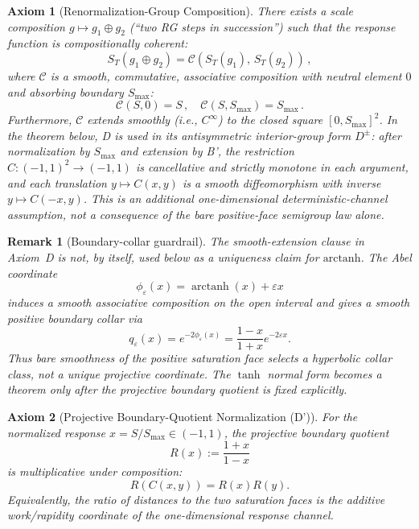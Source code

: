 \documentclass[aps,prd,twocolumn,superscriptaddress,nofootinbib]{revtex4-2}
\newtheorem{remark}{Remark}
\newtheorem{axiom}{Axiom}
\begin{document}
\begin{axiom}[Renormalization-Group Composition]
\label{ax:composition}
There exists a scale composition $g \mapsto g_1 \oplus g_2$ (``two RG steps in succession'') such that the response function is compositionally coherent:
\begin{equation}
S_T(g_1 \oplus g_2) = \mathcal{C}\!\left(S_T(g_1),\, S_T(g_2)\right)\,,
\label{eq:composition}
\end{equation}
where $\mathcal{C}$ is a smooth, commutative, associative composition with neutral element $0$ and absorbing boundary $S_{\max}$:
\begin{equation}
\mathcal{C}(S, 0) = S\,, \quad \mathcal{C}(S, S_{\max}) = S_{\max}\,.
\label{eq:composition_boundary}
\end{equation}
Furthermore, $\mathcal{C}$ extends smoothly (i.e., $C^\infty$) to the closed square $[0, S_{\max}]^2$. In the theorem below, D is used in its antisymmetric interior-group form $D^\pm$: after normalization by $S_{\max}$ and extension by B', the restriction $C:(-1,1)^2\to(-1,1)$ is cancellative and strictly monotone in each argument, and each translation $y\mapsto C(x,y)$ is a smooth diffeomorphism with inverse $y\mapsto C(-x,y)$. This is an additional one-dimensional deterministic-channel assumption, not a consequence of the bare positive-face semigroup law alone.
\end{axiom}

\begin{remark}[Boundary-collar guardrail]
The smooth-extension clause in Axiom~D is not, by itself, used below as a uniqueness claim for $\mathrm{arctanh}$. The Abel coordinate
\[
  \phi_\varepsilon(x)=\operatorname{arctanh}(x)+\varepsilon x
\]
induces a smooth associative composition on the open interval and gives a smooth positive boundary collar via
\[
  q_\varepsilon(x)=e^{-2\phi_\varepsilon(x)}
  =\frac{1-x}{1+x}e^{-2\varepsilon x}.
\]
Thus bare smoothness of the positive saturation face selects a hyperbolic collar class, not a unique projective coordinate. The $\tanh$ normal form becomes a theorem only after the projective boundary quotient is fixed explicitly.
\end{remark}

\begin{axiom}[Projective Boundary-Quotient Normalization (D')]
\label{ax:projective_quotient}
For the normalized response $x=S/S_{\max}\in(-1,1)$, the projective boundary quotient
\[
  R(x):=\frac{1+x}{1-x}
\]
is multiplicative under composition:
\begin{equation}
  R(C(x,y))=R(x)R(y).
  \label{eq:projective_quotient}
\end{equation}
Equivalently, the ratio of distances to the two saturation faces is the additive work/rapidity coordinate of the one-dimensional response channel.
\end{axiom}
\end{document}
